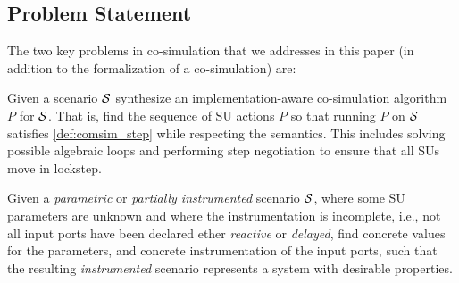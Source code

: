 
\subsection{Problem Statement}
The two key problems in co-simulation that we addresses in this paper (in addition to the formalization of a co-simulation) are:
\begin{compactenum}
  \item Given a scenario $\mathcal{S}$ synthesize an implementation-aware co-simulation algorithm $P$ for $\mathcal{S}$.
  That is, find the sequence of SU actions $P$ so that running $P$ on $\mathcal{S}$ satisfies \cref{def:comsim_step} while respecting the semantics.
  This includes solving possible algebraic loops and performing step negotiation to ensure that all SUs move in lockstep.
  \item Given a \emph{parametric} or \emph{partially instrumented} scenario $\mathcal{S}$, where some SU parameters are unknown and where the instrumentation is incomplete, i.e., not all input ports have been declared ether \emph{reactive} or \emph{delayed}, find concrete values for the parameters, and concrete instrumentation of the input ports, such that the resulting \emph{instrumented} scenario represents a system with desirable properties.
\end{compactenum}
